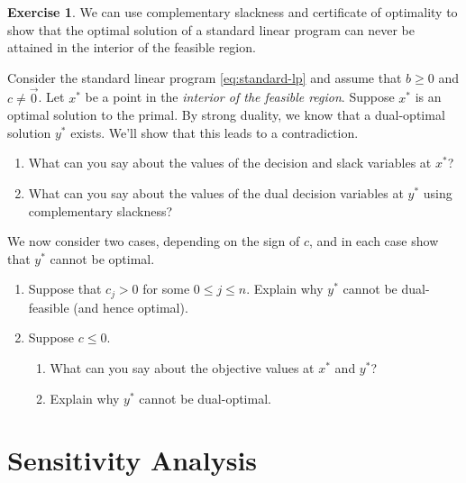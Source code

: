 \documentclass[
]{book}
\providecommand{\tightlist}{%
  \setlength{\itemsep}{0pt}\setlength{\parskip}{0pt}}
\theoremstyle{definition}
\theoremstyle{definition}
\theoremstyle{definition}
\newtheorem{exercise}{Exercise}[chapter]
\theoremstyle{definition}
\theoremstyle{remark}
\begin{document}
\begin{exercise}

We can use complementary slackness and certificate of optimality to show that the optimal solution of a standard linear program can never be attained in the interior of the feasible region.

Consider the standard linear program \eqref{eq:standard-lp} and assume that \(b \ge 0\) and \(c \neq \vec{0}\).
Let \(x^*\) be a point in the \textit{interior of the feasible region}.
Suppose \(x^*\) is an optimal solution to the primal. By strong duality, we know that a dual-optimal solution \(y^*\) exists. We'll show that this leads to a contradiction.

\begin{enumerate}
\def\labelenumi{\arabic{enumi}.}
\tightlist
\item
  What can you say about the values of the decision and slack variables at \(x^*\)?
\item
  What can you say about the values of the dual decision variables at \(y^*\) using complementary slackness?
\end{enumerate}

We now consider two cases, depending on the sign of \(c\), and in each case show that \(y^*\) cannot be optimal.

\begin{enumerate}
\def\labelenumi{\arabic{enumi}.}
\tightlist
\item
  Suppose that \(c_j > 0\) for some \(0 \le j \le n\). Explain why \(y^*\) cannot be dual-feasible (and hence optimal).
\item
  Suppose \(c \le 0\).

  \begin{enumerate}
  \def\labelenumii{\arabic{enumii}.}
  \tightlist
  \item
    What can you say about the objective values at \(x^*\) and \(y^*\)?
  \item
    Explain why \(y^*\) cannot be dual-optimal.
  \end{enumerate}
\end{enumerate}

\end{exercise}

\hypertarget{sensitivity-analysis}{%
\chapter{Sensitivity Analysis}\label{sensitivity-analysis}}
\end{document}

